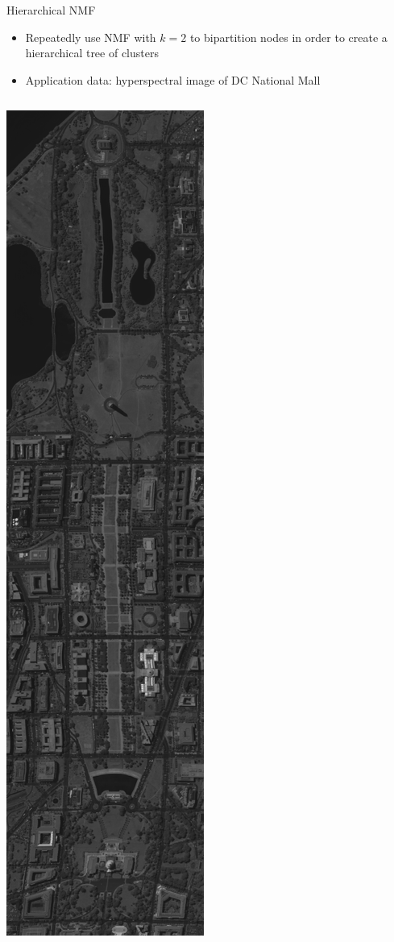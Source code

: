 \documentclass{beamer}
\begin{document}
\begin{frame}{Hierarchical NMF}

\begin{itemize}
	\item Repeatedly use NMF with $k = 2$ to bipartition nodes in order to create a hierarchical tree of clusters
	\item Application data: hyperspectral image of DC National Mall
\end{itemize}

\begin{columns}
\begin{column}{.4\textwidth}
    \centering
    \includegraphics[height=0.6\textheight]{../data/DC/0.png}

\end{column}
\end{columns}
\end{frame}
\end{document}
